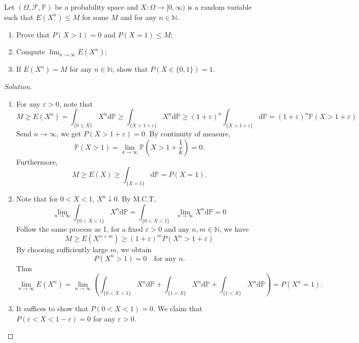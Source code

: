 \documentclass[11pt,singlecolumn, openany, citestyle=authoryear]{elegantbook}
\begin{document}
\begin{CJK}{UTF8}{gbsn}
\begin{exercise}
    Let $(\Omega,\mathcal{F},\mathbb{P})$ be a probability space and $X:\Omega\to[0,\infty)$
    is a random variable such that $E(X^n)\leqslant M$ for some $M$ and 
    for any $n\in\mathbb{N}$.
    \begin{enumerate}
        \item Prove that $P(X> 1)=0$ and $P(X=1)\leqslant M$;
        \item Compute $\displaystyle\lim_{n\to\infty}E(X^n)$;
        \item If $E(X^n)=M$ for any $n\in\mathbb{N}$, show that $P(X\in\{0,1\})=1$.
    \end{enumerate}
\end{exercise}
\begin{proof}[Solution]
    \begin{enumerate}
        \item For any $\varepsilon>0$, note that 
        $$M\geqslant 
        E(X^n)=\int_{\{0\leqslant X\}} X^n\mathrm{d}\mathbb{P} \geqslant 
        \int_{\{X>1+\varepsilon\}} X^n\mathrm{d}\mathbb{P}\geqslant 
        (1+\varepsilon)^n \int_{\{X>1+\varepsilon\}}\mathrm{d}\mathbb{P}=
        (1+\varepsilon)^n \mathbb{P}(X> 1+\varepsilon)
        $$
        Send $n\to\infty$, we get $P(X>1+\varepsilon)=0$.
        By continuity of measure, 
        $$
        \mathbb{P}(X>1)=\lim_{k\to\infty}\mathbb{P}(X>1+\frac{1}{k})=0.
        $$
        Furthermore,
        $$
        M\geqslant E(X)\geqslant \int_{\{X=1\}}\mathrm{d}\mathbb{P}=P(X=1). 
        $$
        \item Note that for $0<X<1$, $X^n\downarrow 0$.
        By M.C.T, 
        $$
        \lim_{n\to\infty}\int_{\{0<X<1\}}X^n\mathrm{d}\mathbb{P}=
        \int_{\{0<X<1\}}\lim_{n\to\infty}X^n\mathrm{d}\mathbb{P}=0
        $$
        Follow the same process as 1, for a fixed $\varepsilon>0$ and any
        $n,m \in \mathbb{N}$, we have 
        $$
        M\geqslant E(X^{n+m}) \geqslant (1+\varepsilon)^m P(X^n>1+\varepsilon)
        $$
        By choosing sufficiently large $m$, we obtain 
        $$
        P(X^n>1)=0 \quad \text{for any } n.
        $$
        Thus
        $$
        \lim_{n\to\infty}E(X^n)=\lim_{n\to\infty}
        \left(\int_{\{0<X<1\}}X^n\mathrm{d}\mathbb{P}
        +\int_{\{1=X\}}X^n\mathrm{d}\mathbb{P}
        +\int_{\{1< X\}}X^n\mathrm{d}\mathbb{P}\right)=P(X^n=1).
        $$
        \item It suffices to show that $P(0<X<1)=0$.
        We claim that $P(\varepsilon < X<1-\varepsilon)=0$ for any $\varepsilon>0$.

\end{enumerate}
\end{proof}
\end{CJK}
\end{document}
